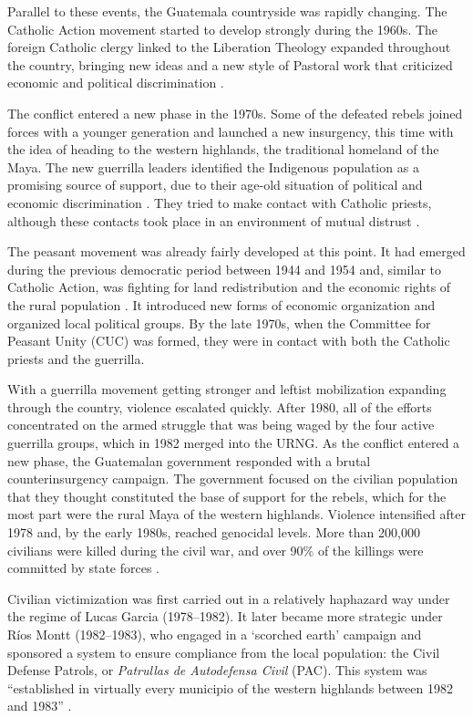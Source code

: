 \documentclass[12pt, notitlepage]{article}
\begin{document}
Parallel to these events, the Guatemala countryside was rapidly changing.
The Catholic Action movement started to develop strongly during the 1960s.
The foreign Catholic clergy linked to the Liberation Theology expanded throughout the country, bringing new ideas and a new style of Pastoral work that criticized economic and political discrimination \citep{Arias:1992aa, Nelson:2009aa, Stoll:1999aa}.

The conflict entered a new phase in the 1970s.
Some of the defeated rebels joined forces with a younger generation and launched a new insurgency, this time with the idea of heading to the western highlands, the traditional homeland of the Maya.
The new guerrilla leaders identified the Indigenous population as a promising source of support, due to their age-old situation of political and economic discrimination \citep{Payeras:1981aa, Arias:1992aa}.
They tried to make contact with Catholic priests, although these contacts took place in an environment of mutual distrust \citep[e.g.][]{Manz:2004aa}.

The peasant movement was already fairly developed at this point.
It had emerged during the previous democratic period between 1944 and 1954 and, similar to Catholic Action, was fighting for land redistribution and the economic rights of the rural population \citep{Handy:1994aa, Forster:2001aa}.
It introduced new forms of economic organization and organized local political groups.
By the late 1970s, when the Committee for Peasant Unity (CUC) was formed, they were in contact with both the Catholic priests and the guerrilla.

With a guerrilla movement getting stronger and leftist mobilization expanding through the country, violence escalated quickly.
After 1980, all of the efforts concentrated on the armed struggle that was being waged by the four active guerrilla groups, which in 1982 merged into the URNG.
As the conflict entered a new phase, the Guatemalan government responded with a brutal counterinsurgency campaign.
The government focused on the civilian population that they thought constituted the base of support for the rebels, which for the most part were the rural Maya of the western highlands.
Violence intensified after 1978 and, by the early 1980s, reached genocidal levels.
More than 200,000 civilians were killed during the civil war, and over 90\% of the killings were committed by state forces \citep{Ball:1999aa, CEH:1999aa}.

Civilian victimization was first carried out in a relatively haphazard way under the regime of Lucas Garcia (1978--1982).
It later became more strategic under Ríos Montt (1982--1983), who engaged in a `scorched earth' campaign and sponsored a system to ensure compliance from the local population: the Civil Defense Patrols, or \textit{Patrullas de Autodefensa Civil} (PAC).
This system was ``established in virtually every municipio of the western highlands between 1982 and 1983'' \citep[272]{Smith:1990ab}.
\end{document}
